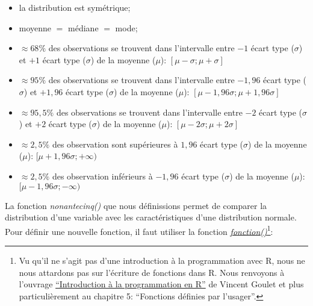 \documentclass[
]{book}
\providecommand{\tightlist}{%
  \setlength{\itemsep}{0pt}\setlength{\parskip}{0pt}}
\begin{document}
\begin{itemize}
\tightlist
\item
  la distribution est symétrique;
\item
  moyenne \(=\) médiane \(=\) mode;
\item
  \(\approx68\%\) des observations se trouvent dans l'intervalle entre \(-1\) écart type (\(\sigma\)) et \(+1\) écart type (\(\sigma\)) de la moyenne (\(\mu\)): \([\mu-\sigma;\mu+\sigma]\)
\item
  \(\approx95\%\) des observations se trouvent dans l'intervalle entre \(-1,96\) écart type (\(\sigma\)) et \(+1,96\) écart type (\(\sigma\)) de la moyenne (\(\mu\)): \([\mu-1,96\sigma;\mu+1,96\sigma]\)
\item
  \(\approx95,5\%\) des observations se trouvent dans l'intervalle entre \(-2\) écart type (\(\sigma\)) et \(+2\) écart type (\(\sigma\)) de la moyenne (\(\mu\)): \([\mu-2\sigma;\mu+2\sigma]\)
\item
  \(\approx2,5\%\) des observation sont supérieures à \(1,96\) écart type (\(\sigma\)) de la moyenne (\(\mu\)): \([\mu+1,96\sigma;+\infty)\)
\item
  \(\approx2,5\%\) des observation inférieurs à \(-1,96\) écart type (\(\sigma\)) de la moyenne (\(\mu\)): \([\mu-1,96\sigma;-\infty)\)
\end{itemize}

La fonction \emph{nonantecinq()} que nous définissions permet de comparer la distribution d'une variable avec les caractéristiques d'une distribution normale. Pour définir une nouvelle fonction, il faut utiliser la fonction \href{https://www.rdocumentation.org/packages/base/versions/3.6.2/topics/function}{\emph{fonction()}}\footnote{Vu qu'il ne s'agit pas d'une introduction à la programmation avec R, nous ne nous attardons pas sur l'écriture de fonctions dans R. Nous renvoyons à l'ouvrage \href{https://cran.r-project.org/doc/contrib/Goulet_introduction_programmation_R.pdf}{``Introduction à la programmation en R''} de Vincent Goulet et plus particulièrement au chapitre 5: ``Fonctions définies par l'usager''.}:
\end{document}
